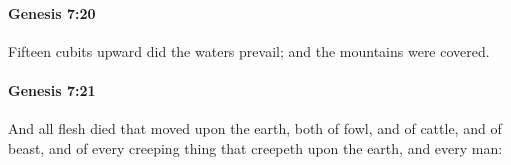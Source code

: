		\paragraph{Genesis 7:20} %
			\label{GENESIS-7-20}

			Fifteen cubits upward did the waters prevail; and the mountains were covered.


		\paragraph{Genesis 7:21} %
			\label{GENESIS-7-21}

			And all flesh died that moved upon the earth, both of fowl, and of cattle, and of beast, and of every creeping thing that creepeth upon the earth, and every man:


